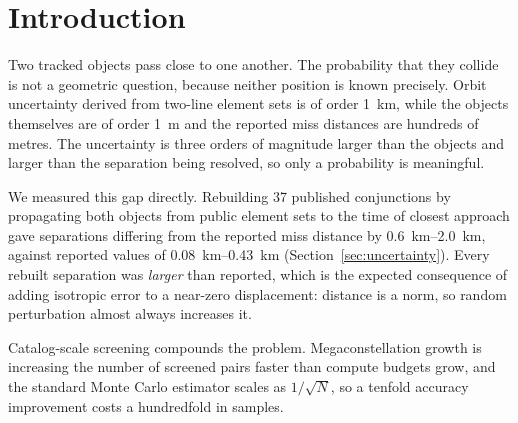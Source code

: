 \documentclass[11pt]{article}
\begin{document}
\section{Introduction}

Two tracked objects pass close to one another. The probability that they
collide is not a geometric question, because neither position is known
precisely. Orbit uncertainty derived from two-line element sets is of order
\SI{1}{\kilo\meter}, while the objects themselves are of order
\SI{1}{\meter} and the reported miss distances are hundreds of metres. The
uncertainty is three orders of magnitude larger than the objects and larger
than the separation being resolved, so only a probability is meaningful.

We measured this gap directly. Rebuilding 37 published conjunctions by
propagating both objects from public element sets to the time of closest
approach gave separations differing from the reported miss distance by
\SIrange{0.6}{2.0}{\kilo\meter}, against reported values of
\SIrange{0.08}{0.43}{\kilo\meter} (Section~\ref{sec:uncertainty}). Every
rebuilt separation was \emph{larger} than reported, which is the expected
consequence of adding isotropic error to a near-zero displacement: distance
is a norm, so random perturbation almost always increases it.

Catalog-scale screening compounds the problem. Megaconstellation growth is
increasing the number of screened pairs faster than compute budgets grow,
and the standard Monte Carlo estimator scales as $1/\sqrt{N}$, so a tenfold
accuracy improvement costs a hundredfold in samples.
\end{document}
